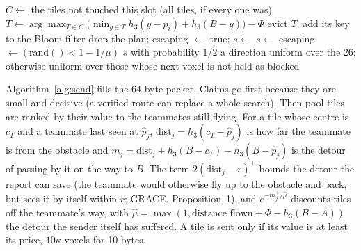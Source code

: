\documentclass[11pt,a4paper]{article}
\begin{document}
\begin{algorithm}[htbp]
\caption{\textsc{Forget}: certified eviction (step 3), and the escape walk (step 6)}\label{alg:forget}
\begin{algorithmic}[1]
    \State $C\gets$ the tiles not touched this slot (all tiles, if every one was)
    \State $T\gets\arg\max_{T\in C}\big(\min_{y\in T}h_3(y-p_i)+h_3(B-y)\big)-\Phi$ 
    \State evict $T$;\; add its key to the Bloom filter
  \EndWhile
\EndFunction
{}
  \State drop the plan;\; escaping $\gets$ true;\; $s\gets$ 
  \State \Return {}
\EndFunction
{}
   $s\gets$  \EndIf
  \State escaping $\gets(\mathrm{rand}()<1-1/\mu)$ 
  \State \Return $s$
\EndFunction
{}
  \State with probability $1/2$ a direction uniform over the 26; otherwise uniform over those whose next voxel is not
  held as blocked 
\EndFunction
\end{algorithmic}
\end{algorithm}

Algorithm~\ref{alg:send} fills the 64-byte packet. Claims go first because they are small and decisive (a verified
route can replace a whole search). Then pool tiles are ranked by their value to the teammates still flying. For a tile
whose centre is $c_T$ and a teammate last seen at $\hat p_j$, $\mathrm{dist}_j=h_3(c_T-\hat p_j)$ is how far the teammate
is from the obstacle and $m_j=\mathrm{dist}_j+h_3(B-c_T)-h_3(B-\hat p_j)$ is the detour of passing by it on the way to
$B$. The term $2(\mathrm{dist}_j-r)^+$ bounds the detour the report can save (the teammate would otherwise fly up to the
obstacle and back, but sees it by itself within $r$; GRACE, Proposition~1), and $e^{-m_j^+/\hat\mu}$ discounts tiles off
the teammate's way, with $\hat\mu=\max(1,\text{distance flown}+\Phi-h_3(B-A))$ the detour the sender itself has
suffered. A tile is sent only if its value is at least its price, $10\kappa$ voxels for 10 bytes.
\end{document}
